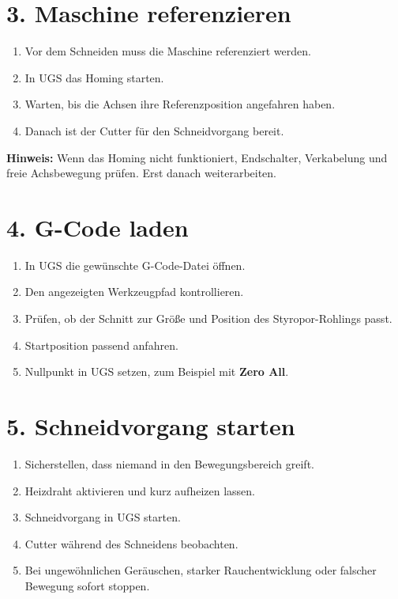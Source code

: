 \documentclass[10pt,a4paper]{article}
\begin{document}
	\section*{3. Maschine referenzieren}
	
	\begin{enumerate}
		\item Vor dem Schneiden muss die Maschine referenziert werden.
		\item In UGS das Homing starten.
		\item Warten, bis die Achsen ihre Referenzposition angefahren haben.
		\item Danach ist der Cutter für den Schneidvorgang bereit.
	\end{enumerate}
	
	\textbf{Hinweis:}  
	Wenn das Homing nicht funktioniert, Endschalter, Verkabelung und freie Achsbewegung prüfen. Erst danach weiterarbeiten.
	
	\section*{4. G-Code laden}
	
	\begin{enumerate}
		\item In UGS die gewünschte G-Code-Datei öffnen.
		\item Den angezeigten Werkzeugpfad kontrollieren.
		\item Prüfen, ob der Schnitt zur Größe und Position des Styropor-Rohlings passt.
		\item Startposition passend anfahren.
		\item Nullpunkt in UGS setzen, zum Beispiel mit \textbf{Zero All}.
	\end{enumerate}
	
	\section*{5. Schneidvorgang starten}
	
	\begin{enumerate}
		\item Sicherstellen, dass niemand in den Bewegungsbereich greift.
		\item Heizdraht aktivieren und kurz aufheizen lassen.
		\item Schneidvorgang in UGS starten.
		\item Cutter während des Schneidens beobachten.
		\item Bei ungewöhnlichen Geräuschen, starker Rauchentwicklung oder falscher Bewegung sofort stoppen.
	\end{enumerate}
	
\end{document}
